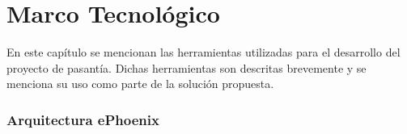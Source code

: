 \chapter{Marco Tecnológico}
\label{capitulo3}

En este capítulo se mencionan las herramientas utilizadas para el desarrollo
del proyecto de pasantía. Dichas herramientas son descritas brevemente y se menciona
su uso como parte de la solución propuesta.

\subsection{Arquitectura ePhoenix}

